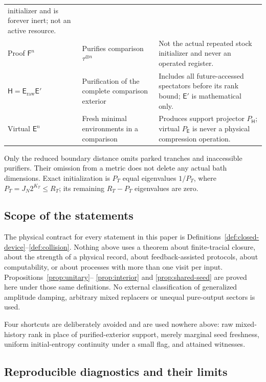 \documentclass[11pt,a4paper]{article}
\numberwithin{equation}{section}
\theoremstyle{plain}
\theoremstyle{definition}
\newcommand{\rg}[1]{\mathsf{#1}}
\begin{document}
\begin{center}
\begin{tabular}{@{}>{\raggedright\arraybackslash}p{2.6cm}>{\raggedright\arraybackslash}p{4.0cm}>{\raggedright\arraybackslash}p{7.8cm}@{}}
initializer and is forever inert; not an active resource.\\
Proof $\rg{F}^n$ & Purifies comparison $\tau^{\otimes n}$ & Not the actual
repeated stock initializer and never an operated register.\\
$\rg{H}=\rg{E}_{\mathrm{raw}}\rg{E}'$ & Purification of the complete
comparison exterior & Includes all future-accessed spectators before its rank
bound; $\rg{E}'$ is mathematical only.\\
Virtual $\rg{E}^n$ & Fresh minimal environments in a comparison & Produces
support projector $P_{\rg{H}}$; virtual $P_{\rg{E}}$ is never a physical
compression operation.\\
\hline
\end{tabular}
\end{center}

Only the reduced boundary distance omits parked tranches and inaccessible
purifiers. Their omission from a metric does not delete any actual bath
dimensions. Exact initialization is $P_T$ equal eigenvalues $1/P_T$, where
$P_T=J_N2^{K_T}\le R_T$; its remaining $R_T-P_T$ eigenvalues are zero.

\subsection{Scope of the statements}

The physical contract for every statement in this paper is
Definitions~\ref{def:closed-device}--\ref{def:collision}. Nothing above uses a
theorem about finite-tracial closure, about the strength of a physical record,
about feedback-assisted protocols, about computability, or about processes
with more than one visit per input. Propositions~\ref{prop:unitary}--%
\ref{prop:interior} and \ref{prop:shared-seed} are proved here under those
same definitions. No external classification of generalized amplitude damping,
arbitrary mixed replacers or unequal pure-output sectors is used.

Four shortcuts are deliberately avoided and are used nowhere above: raw
mixed-history rank in place of purified-exterior support, merely marginal seed
freshness, uniform initial-entropy continuity under a small flag, and attained
witnesses.

\subsection{Reproducible diagnostics and their limits}
\label{app:diagnostics}
\end{document}
